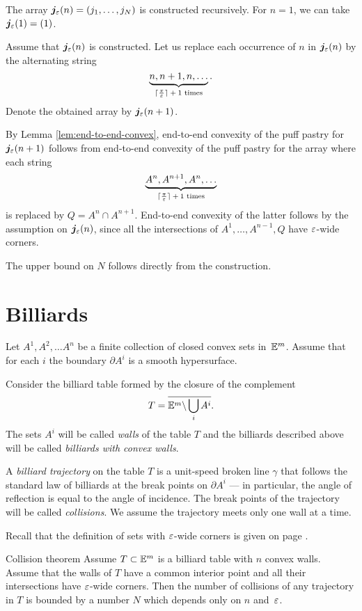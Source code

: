 The array $\bm{j}_\varepsilon(n)=(j_1,\dots,j_N)$  is constructed recursively.
For $n=1$, we can take $\bm{j}_\varepsilon(1)=(1)$.

Assume that $\bm{j}_\varepsilon(n)$ is constructed.
Let us replace each occurrence of $n$ in $\bm{j}_\varepsilon(n)$ by the alternating string 
\[\underbrace{n,n+1,n,\dots}_{\text{$\lceil\tfrac\pi{\varepsilon}\rceil+1$ times}}.\]
Denote the obtained array by $\bm{j}_\varepsilon(n+1)$.

By Lemma \ref{lem:end-to-end-convex},
end-to-end convexity of the puff pastry for $\bm{j}_\eps(n\z+1)$
follows from end-to-end convexity of the puff pastry for the array
where each string
\[\underbrace{A^n,A^{n+1},A^n,\dots}_{\text{$\lceil\tfrac\pi{\varepsilon}\rceil+1$ times}}\]
is replaced by  $Q=A^n\cap A^{n+1}$.
End-to-end convexity of the latter follows by the assumption on $\bm{j}_\varepsilon(n)$, 
since all the intersections of $A^1,\dots,A^{n-1},Q$
have $\varepsilon$-wide corners.

The upper bound on $N$ follows directly from the construction.
\qeds



\section{Billiards}

Let $A^1,A^2,\dots A^n$ be a finite collection of closed convex sets in~$\mathbb{E}^m$.
Assume that for each $i$
the boundary $\partial A^i$ is a smooth hypersurface.

Consider the billiard table formed by the closure of the complement 
$$T=\overline{\mathbb{E}^m\backslash \bigcup_{i} A^i}.$$
The sets $A^i$ will be called {}\emph{walls} of the table $T$ 
and the billiards described above will be called {}\emph{billiards with convex walls}.

A {}\emph{billiard trajectory} 
on the table $T$ is a unit-speed broken line $\gamma$ 
that  follows  the
standard law of billiards 
at the break points on $\partial A^i$ 
--- in particular, the angle of reflection is equal to the angle of incidence.
The break points of the trajectory will be called {}\emph{collisions}.
We assume the trajectory meets only one wall at a time.

Recall that the definition of sets with $\varepsilon$-wide corners is given on page \pageref{page:wide corners}.

\begin{thm}{Collision theorem}\label{thm:collision}
Assume $T\subset\mathbb{E}^m$ is a billiard table with $n$ convex walls.
Assume that the walls of $T$ have a common interior point  and all their intersections have $\varepsilon$-wide corners.
Then the number of collisions of any trajectory in  $T$  is bounded
by a number $N$ which depends only on $n$ and~$\varepsilon$.
\end{thm}

